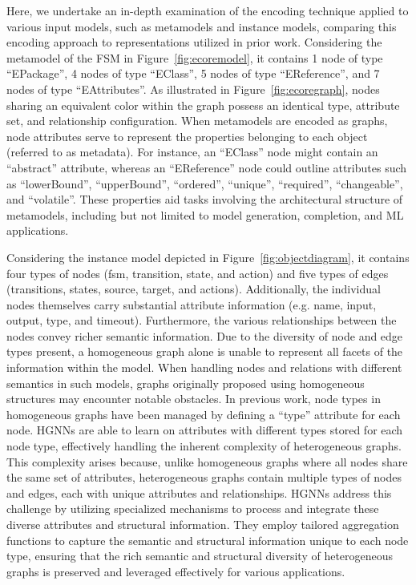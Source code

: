 \documentclass[journal,article,submit,moreauthors,technologies]{Definitions/mdpi}
\begin{document}
Here, we undertake an in-depth examination of the encoding technique applied to various input models, such as metamodels and instance models, comparing this encoding approach to representations utilized in prior work. Considering the metamodel of the FSM in Figure~\ref{fig:ecoremodel}, it contains 1 node of type ``EPackage'', 4 nodes of type ``EClass'', 5 nodes of type ``EReference'', and 7 nodes of type ``EAttributes''. As illustrated in Figure~\ref{fig:ecoregraph}, nodes sharing an equivalent color within the graph possess an identical type, attribute set, and relationship configuration. When metamodels are encoded as graphs, node attributes serve to represent the properties belonging to each object (referred to as metadata). For instance, an ``EClass'' node might contain an ``abstract'' attribute, whereas an ``EReference'' node could outline attributes such as ``lowerBound'', ``upperBound'', ``ordered'', ``unique'', ``required'', ``changeable'', and ``volatile''. These properties aid tasks involving the architectural structure of metamodels, including but not limited to model generation, completion, and ML applications.

Considering the instance model depicted in Figure~\ref{fig:objectdiagram}, it contains four types of nodes (fsm, transition, state, and action) and five types of edges (transitions, states, source, target, and actions). Additionally, the individual nodes themselves carry substantial attribute information (e.g. name, input, output, type, and timeout). Furthermore, the various relationships between the nodes convey richer semantic information. Due to the diversity of node and edge types present, a homogeneous graph alone is unable to represent all facets of the information within the model. When handling nodes and relations with different semantics in such models, graphs originally proposed using homogeneous structures may encounter notable obstacles. In previous work, node types in homogeneous graphs have been managed by defining a ``type'' attribute for each node. HGNNs are able to learn on attributes with different types stored for each node type, effectively handling the inherent complexity of heterogeneous graphs. This complexity arises because, unlike homogeneous graphs where all nodes share the same set of attributes, heterogeneous graphs contain multiple types of nodes and edges, each with unique attributes and relationships. HGNNs address this challenge by utilizing specialized mechanisms to process and integrate these diverse attributes and structural information. They employ tailored aggregation functions to capture the semantic and structural information unique to each node type, ensuring that the rich semantic and structural diversity of heterogeneous graphs is preserved and leveraged effectively for various applications.
\end{document}
